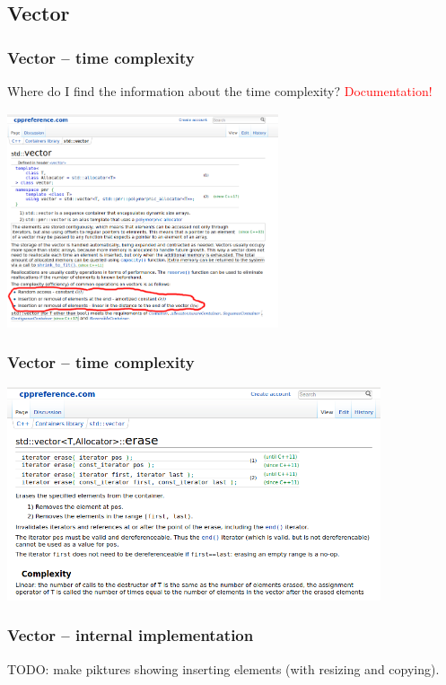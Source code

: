 \documentclass{beamer}
\begin{document}
\subsection{Vector}

\begin{frame}
    \frametitle{Vector -- time complexity}
    Where do I find the information about the time complexity?
    \pause
    \textcolor{red}{Documentation!}

    \centering
    \includegraphics[width=8cm]{vector.png}
\end{frame}

\begin{frame}
    \frametitle{Vector -- time complexity}
    \includegraphics[width=11cm]{vector_erase.png}
\end{frame}

\begin{frame}
    \frametitle{Vector -- internal implementation}

    TODO: make piktures showing inserting elements (with resizing and copying).

\end{frame}
\end{document}
